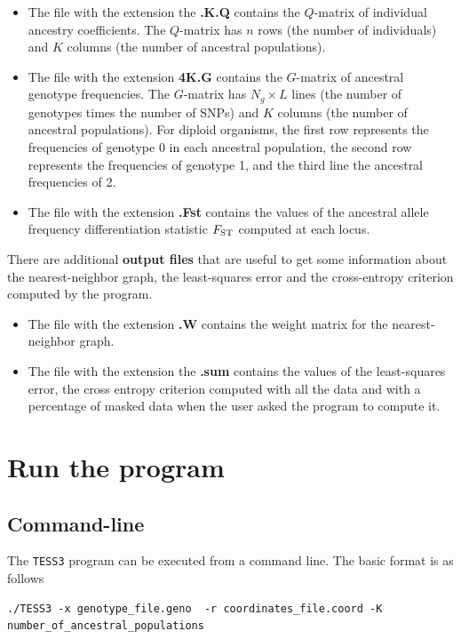 \documentclass[10pt,a4paper]{article}
\begin{document}
\begin{itemize}
\item The file with the extension the {\bf .K.Q} contains the $Q$-matrix of individual ancestry coefficients.
The $Q$-matrix has $n$ rows (the number of individuals) and $K$ columns (the number of ancestral populations).
\item The file with the extension {\bf 4K.G} contains the $G$-matrix of ancestral genotype frequencies.
The $G$-matrix has $N_g\times L$ lines (the number of genotypes times the number of SNPs) and $K$ columns (the number of ancestral populations). For diploid organisms, the first row represents the frequencies of genotype 0 in each ancestral population, the second row represents the frequencies of genotype 1, and the third line the ancestral frequencies of 2.
\item The file with the extension {\bf .Fst} contains the values of the ancestral allele frequency differentiation statistic $F_{\rm ST}$ computed at each locus.  
\end{itemize}

There are additional {\bf output files} that are useful to get some information about the nearest-neighbor graph, the least-squares error and the cross-entropy criterion computed by the program.

\begin{itemize}
\item The file with the extension {\bf .W} contains the weight matrix for the nearest-neighbor graph.
\item The file with the extension the {\bf .sum} contains the values of the least-squares error, the cross entropy criterion computed with all the data and with a percentage of masked data when the user asked the program to compute it.
\end{itemize}

\section{Run the program}
\subsection{Command-line}
The {\tt TESS3} program can be executed from a command line. The basic format is as follows
\begin{Verbatim}[frame=single]
./TESS3 -x genotype_file.geno  -r coordinates_file.coord -K number_of_ancestral_populations
\end{Verbatim}
\end{document}
